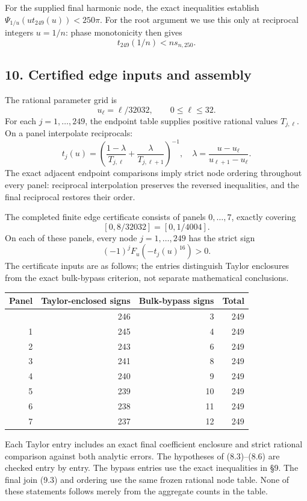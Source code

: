 \documentclass[
  11pt,
]{article}
\begin{document}
For the supplied final harmonic node, the exact inequalities establish
\(\Psi_{1/u}(ut_{249}(u))<250\pi\). For the root argument we use this
only at reciprocal integers \(u=1/n\): phase monotonicity then gives \[
 t_{249}(1/n)<n s_{n,250}.                                   \tag{9.3}
\]

\subsection{10. Certified edge inputs and
assembly}\label{certified-edge-inputs-and-assembly}

The rational parameter grid is \[
 u_\ell=\ell/32032,\qquad0\le\ell\le32.
\] For each \(j=1,\ldots,249\), the endpoint table supplies positive
rational values \(T_{j,\ell}\). On a panel interpolate reciprocals: \[
 t_j(u)=\left(\frac{1-\lambda}{T_{j,\ell}}
               +\frac{\lambda}{T_{j,\ell+1}}\right)^{-1},
 \quad \lambda=\frac{u-u_\ell}{u_{\ell+1}-u_\ell}.
\] The exact adjacent endpoint comparisons imply strict node ordering
throughout every panel: reciprocal interpolation preserves the reversed
inequalities, and the final reciprocal restores their order.

The completed finite edge certificate consists of panels \(0,\ldots,7\),
exactly covering \[
 [0,8/32032]=[0,1/4004].
\] On each of these panels, every node \(j=1,\ldots,249\) has the strict
sign \[
 (-1)^jF_u(-t_j(u)^{16})>0.                                  \tag{10.1}
\] The certificate inputs are as follows; the entries distinguish Taylor
enclosures from the exact bulk-bypass criterion, not separate
mathematical conclusions.

\begin{longtable}[]{@{}rrrr@{}}
\toprule\noalign{}
Panel & Taylor-enclosed signs & Bulk-bypass signs & Total \\
\midrule\noalign{}
\endhead
\bottomrule\noalign{}
\endlastfoot
0 & 246 & 3 & 249 \\
1 & 245 & 4 & 249 \\
2 & 243 & 6 & 249 \\
3 & 241 & 8 & 249 \\
4 & 240 & 9 & 249 \\
5 & 239 & 10 & 249 \\
6 & 238 & 11 & 249 \\
7 & 237 & 12 & 249 \\
\end{longtable}

Each Taylor entry includes an exact final coefficient enclosure and
strict rational comparison against both analytic errors. The hypotheses
of (8.3)--(8.6) are checked entry by entry. The bypass entries use the
exact inequalities in §9. The final join (9.3) and ordering use the same
frozen rational node table. None of these statements follows merely from
the aggregate counts in the table.
\end{document}
